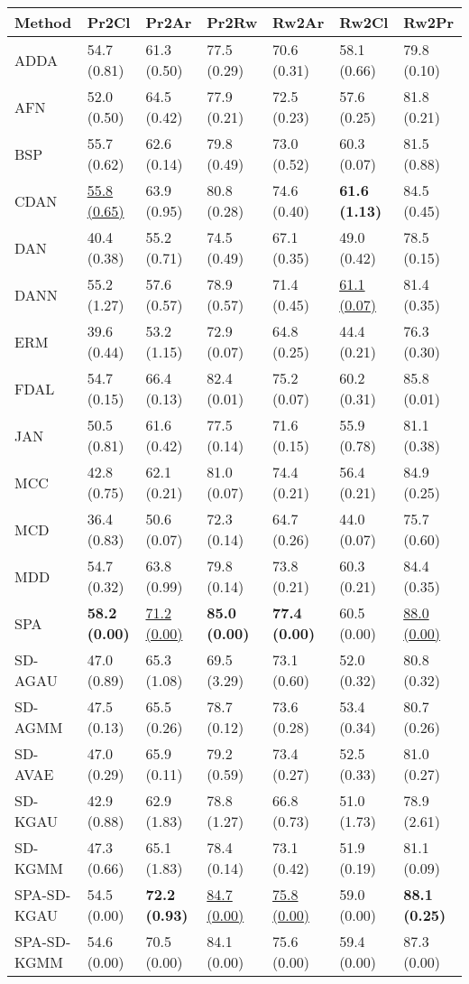 \vskip 0.5cm
\begin{tabular}{lllllll}
\toprule
Method & Pr2Cl & Pr2Ar & Pr2Rw & Rw2Ar & Rw2Cl & Rw2Pr \\
\midrule
ADDA & 54.7 (0.81) & 61.3 (0.50) & 77.5 (0.29) & 70.6 (0.31) & 58.1 (0.66) & 79.8 (0.10) \\
AFN & 52.0 (0.50) & 64.5 (0.42) & 77.9 (0.21) & 72.5 (0.23) & 57.6 (0.25) & 81.8 (0.21) \\
BSP & 55.7 (0.62) & 62.6 (0.14) & 79.8 (0.49) & 73.0 (0.52) & 60.3 (0.07) & 81.5 (0.88) \\
CDAN & \underline{55.8 (0.65)} & 63.9 (0.95) & 80.8 (0.28) & 74.6 (0.40) & \textbf{61.6 (1.13)} & 84.5 (0.45) \\
DAN & 40.4 (0.38) & 55.2 (0.71) & 74.5 (0.49) & 67.1 (0.35) & 49.0 (0.42) & 78.5 (0.15) \\
DANN & 55.2 (1.27) & 57.6 (0.57) & 78.9 (0.57) & 71.4 (0.45) & \underline{61.1 (0.07)} & 81.4 (0.35) \\
ERM & 39.6 (0.44) & 53.2 (1.15) & 72.9 (0.07) & 64.8 (0.25) & 44.4 (0.21) & 76.3 (0.30) \\
FDAL & 54.7 (0.15) & 66.4 (0.13) & 82.4 (0.01) & 75.2 (0.07) & 60.2 (0.31) & 85.8 (0.01) \\
JAN & 50.5 (0.81) & 61.6 (0.42) & 77.5 (0.14) & 71.6 (0.15) & 55.9 (0.78) & 81.1 (0.38) \\
MCC & 42.8 (0.75) & 62.1 (0.21) & 81.0 (0.07) & 74.4 (0.21) & 56.4 (0.21) & 84.9 (0.25) \\
MCD & 36.4 (0.83) & 50.6 (0.07) & 72.3 (0.14) & 64.7 (0.26) & 44.0 (0.07) & 75.7 (0.60) \\
MDD & 54.7 (0.32) & 63.8 (0.99) & 79.8 (0.14) & 73.8 (0.21) & 60.3 (0.21) & 84.4 (0.35) \\
SPA & \textbf{58.2 (0.00)} & \underline{71.2 (0.00)} & \textbf{85.0 (0.00)} & \textbf{77.4 (0.00)} & 60.5 (0.00) & \underline{88.0 (0.00)} \\
\midrule
SD-AGAU & 47.0 (0.89) & 65.3 (1.08) & 69.5 (3.29) & 73.1 (0.60) & 52.0 (0.32) & 80.8 (0.32) \\
SD-AGMM & 47.5 (0.13) & 65.5 (0.26) & 78.7 (0.12) & 73.6 (0.28) & 53.4 (0.34) & 80.7 (0.26) \\
SD-AVAE & 47.0 (0.29) & 65.9 (0.11) & 79.2 (0.59) & 73.4 (0.27) & 52.5 (0.33) & 81.0 (0.27) \\
SD-KGAU & 42.9 (0.88) & 62.9 (1.83) & 78.8 (1.27) & 66.8 (0.73) & 51.0 (1.73) & 78.9 (2.61) \\
SD-KGMM & 47.3 (0.66) & 65.1 (1.83) & 78.4 (0.14) & 73.1 (0.42) & 51.9 (0.19) & 81.1 (0.09) \\
SPA-SD-KGAU & 54.5 (0.00) & \textbf{72.2 (0.93)} & \underline{84.7 (0.00)} & \underline{75.8 (0.00)} & 59.0 (0.00) & \textbf{88.1 (0.25)} \\
SPA-SD-KGMM & 54.6 (0.00) & 70.5 (0.00) & 84.1 (0.00) & 75.6 (0.00) & 59.4 (0.00) & 87.3 (0.00) \\
\bottomrule
\end{tabular}
